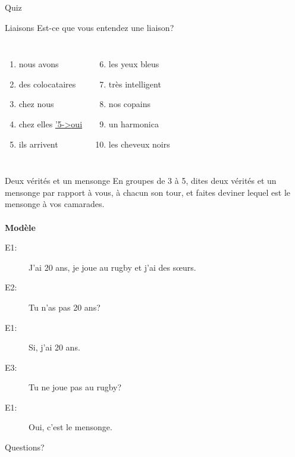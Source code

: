 \documentclass{beamer}
\begin{document}
  \begin{frame}{}
    \begin{center}
      \Large Quiz
    \end{center}
  \end{frame}

  \begin{frame}{Liaisons}
    Est-ce que vous entendez une liaison?
    \begin{columns}
        \begin{enumerate}
          \item nous avons \underline{}
          \item des colocataires \underline{\uncover<3->{non}}
          \item chez nous \underline{}
          \item chez elles \underline{\uncover'5->{oui}}
          \item ils arrivent \underline{}
        \end{enumerate}
        \begin{enumerate}
          \setcounter{enumi}{5}
          \item les yeux bleus \underline{\uncover<7->{oui}}
          \item très intelligent \underline{}
          \item nos copains \underline{}
          \item un harmonica \underline{}
          \item les cheveux noirs \underline{}
        \end{enumerate}
    \end{columns}
  \end{frame}

  \begin{frame}{Deux vérités et un mensonge }
    En groupes de 3 à 5, dites deux vérités et un mensonge par rapport à vous, à chacun son tour, et faites deviner lequel est le mensonge à vos camarades. \\
     \\
    \textbf{Modèle} \\
    \begin{description}
      \item[E1:] J'ai 20 ans, je joue au rugby et j'ai des sœurs.
      \item[E2:] Tu n'as pas 20 ans?
      \item[E1:] Si, j'ai 20 ans.
      \item[E3:] Tu ne joue pas au rugby?
      \item[E1:] Oui, c'est le mensonge.
    \end{description}
  \end{frame}

  \begin{frame}{}
    \begin{center}
      \Large Questions?
    \end{center}
  \end{frame}
\end{document}
